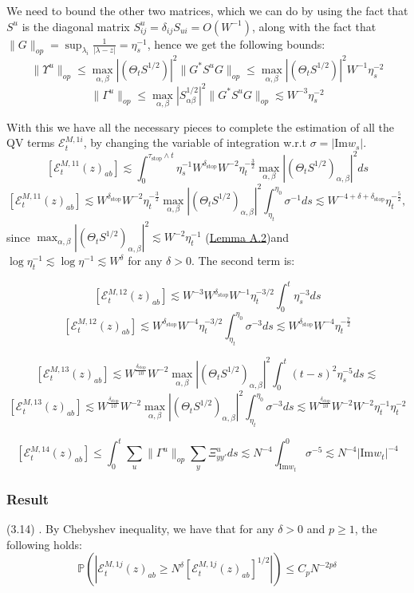 \documentclass[11pt]{article}
\newcommand{\E}{\mathcal{E}}
\newcommand{\sto}{\text{stop}}
\begin{document}
\noindent We need to bound the other two matrices, which we can do by using the fact that $S^u$ is the diagonal matrix $S^u_{ij} = \delta_{ij}S_{ui} = O(W^{-1})$, along with the fact that $\|G\|_{op} = \sup_{\lambda_i}\frac{1}{|\lambda -z|}  = \eta_s^{-1}$,
hence we get the following bounds:
$$\|\Upsilon^u\|_{op}\leq \max_{\alpha, \beta}|(\Theta_t S^{1/2})|^2\|G^* S^u G\|_{op}\leq \max_{\alpha, \beta}|(\Theta_t S^{1/2})|^2 W^{-1}\eta_s^{-2}$$
$$\|\Gamma^u\|_{op}\leq\max_{\alpha,\beta}|S_{\alpha\beta}^{1/2}|^2\|G^* S^u G\|_{op}\lesssim W^{-3}\eta_s^{-2}$$

\noindent With this we have all the necessary pieces to complete the estimation of all the QV terms $\mathcal{E}^{M, 1i}_t$, by changing the variable of integration w.r.t $\sigma = |\text{Im}w_s|$.
$$\left[\mathcal{E}_{t}^{M, 11}(z)_{ab}\right]\lesssim \int_0^{\tau_\sto\wedge t} \eta_s^{-1} W^{\delta_\sto}W^{-2}\eta_t^{-\frac{3}{2}}\max_{\alpha, \beta}|(\Theta_t S^{1/2})_{\alpha, \beta}|^2ds$$
$$\left[\mathcal{E}_{t}^{M, 11}(z)_{ab}\right]\lesssim W^{\delta_\sto}W^{-2}\eta_t^{-\frac{3}{2}} \max_{\alpha, \beta}|(\Theta_t S^{1/2})_{\alpha, \beta}|^2 \int_{\eta_t}^{\eta_0} \sigma^{-1}ds\lesssim W^{-4+\delta+\delta_\sto}\eta_t^{-\frac{5}{2}},$$
since $\max_{\alpha, \beta}|(\Theta_t S^{1/2})_{\alpha, \beta}|^2 \lesssim W^{-2}\eta_t^{-1}$ (\hyperref[lemma-a2]{Lemma A.2})and $\log \eta_t^{-1}\lesssim \log \eta^{-1}\lesssim W^{\delta}$ for any $\delta>0$. The second term is: 

$$\left[\mathcal{E}_{t}^{M, 12}(z)_{ab}\right] \lesssim   W^{-3}W^{\delta_\sto}W^{-1}\eta_t^{-3/2}\int_0^{t}\eta_s^{-3}ds$$
$$\left[\mathcal{E}_{t}^{M, 12}(z)_{ab}\right] \lesssim W^{\delta_\sto}W^{-4}\eta_t^{-3/2}\int_{\eta_t}^{\eta_0}\sigma^{-3}ds\lesssim W^{\delta_\sto} W^{-4}\eta_t^{-\frac{7}{2}}$$

$$\left[\mathcal{E}_{t}^{M, 13}(z)_{ab}\right] \lesssim W^{\frac{\delta_\sto}{10}}W^{-2} \max_{\alpha, \beta}|(\Theta_t S^{1/2})_{\alpha, \beta}|^2 \int_0^{t} (t-s)^2 \eta_s^{-5}ds\lesssim $$
$$\left[\mathcal{E}_{t}^{M, 13}(z)_{ab}\right] \lesssim W^{\frac{\delta_\sto}{10}}W^{-2} \max_{\alpha, \beta}|(\Theta_t S^{1/2})_{\alpha, \beta}|^2 \int_{\eta_t}^{\eta_0}\sigma^{-3}ds\lesssim W^{\frac{\delta_\sto}{10}}W^{-2} W^{-2}\eta_t^{-1}\eta_t^{-2}$$

$$\left[\mathcal{E}_{t}^{M, 14}(z)_{ab}\right] \leq \int_0^t \sum_u \|\Gamma^u\|_{op}\sum_y \Xi_{yy'}^uds\lesssim N^{-4}\int_{\text{Im}w_t}^0\sigma^{-5}\lesssim N^{-4}|\text{Im}w_t|^{-4}$$


\subsubsection*{Result}
(3.14) \cite{bandSDE}. By Chebyshev inequality, we have that for any $\delta>0$ and $p\geq 1$, the following holds: 
$$\mathbb{P}\left(\left\vert \E_t^{M, 1j}(z)_{ab}\geq N^\delta [\E_t^{M, 1j}(z)_{ab}]^{1/2}\right\vert\right)\leq C_p N^{-2p\delta}$$
\end{document}
